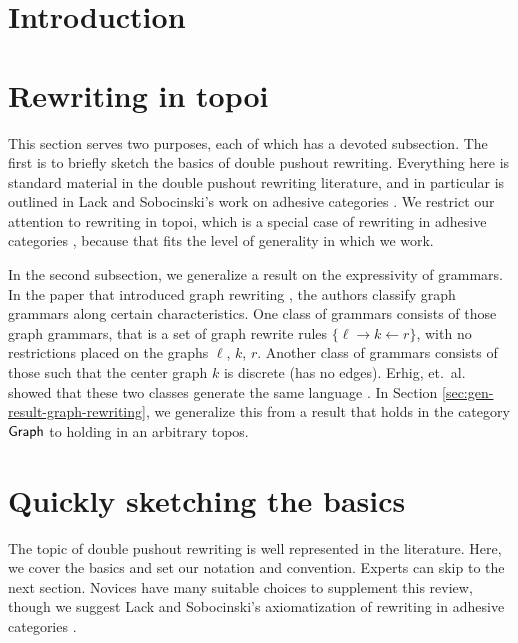 \documentclass{amsart}
\begin{document}


\section{Introduction}
\label{sec:Intro}


\section{Rewriting in topoi}
\label{sec:RewriteTopoi}

This section serves two purposes, each of which has a
devoted subsection.  The first is to briefly sketch the
basics of double pushout rewriting.  Everything here is
standard material in the double pushout rewriting
literature, and in particular is outlined in Lack and
Sobocinski's work on adhesive categories
\cite{LackSobo_Adhesive}.  We restrict our attention to
rewriting in topoi, which is a special case of rewriting in
adhesive categories \cite{LackSobo_TopsIsAdh}, because that
fits the level of generality in which we work.

In the second subsection, we generalize a result on the
expressivity of grammars.  In the paper that introduced
graph rewriting \cite{Ehrig_GraphGram}, the authors classify
graph grammars along certain characteristics. One class of
grammars consists of those graph grammars, that is a set of
graph rewrite rules $ \{ \ell \to k \gets r \} $, with no
restrictions placed on the graphs $ \ell $, $ k $, $ r
$. Another class of grammars consists of those such that the
center graph $ k $ is discrete (has no edges).  Erhig,
et.~al. showed that these two classes generate the same
language \cite[Prop.~3.3]{Ehrig_GraphGram}. In Section
\ref{sec:gen-result-graph-rewriting}, we generalize this
from a result that holds in the category $ \mathsf{Graph} $ to
holding in an arbitrary topos.  

\section{Quickly sketching the basics}
\label{sec:SketchBasics}


The topic of double pushout rewriting is well represented in
the literature. Here, we cover the basics and set our
notation and convention. Experts can skip to the next
section. Novices have many suitable choices to supplement
this review, though we suggest Lack and Sobocinski's
axiomatization of rewriting in adhesive categories
\cite{LackSobo_Adhesive}.
\end{document}
